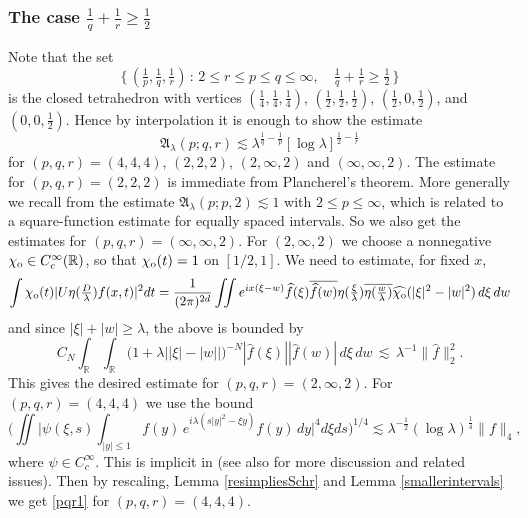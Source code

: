 \documentclass[11pt]{amsart}
\theoremstyle{definition}
\numberwithin{theorem}{section}
\numberwithin{definition}{section}
\numberwithin{equation}{section}
\newcommand{\Be}{\begin{equation}}
\newcommand{\Ee}{\end{equation}}
\newcommand{\R}{\mathbb{R}}
\renewcommand{\le}{\leqslant}
\renewcommand{\ge}{\geqslant}
\def\R{\mathbb R}
\def\lc{\lesssim}
\def\la{\lambda}             \def\La{\Lambda}
\def\fA{{\mathfrak {A}}}
\def\bbR{{\mathbb {R}}}
\renewcommand{\le}{\leqslant}
\renewcommand{\ge}{\geqslant}
\begin{document}
\subsubsection*{The case $\frac1q+\frac1r\ge \frac12$}
Note that the set
\[\big\{\,(\tfrac1p, \tfrac1q,\tfrac1r)\,:\,  2\le r\le p\le q\le \infty,\quad \tfrac1q+\tfrac1r\ge \tfrac12\,\big\}\]
is the closed tetrahedron with vertices $(\frac14, \frac14, \frac14)$, $(\frac12,\frac12,\frac12)$,
$(\frac12, 0,\frac12)$, and $(0, 0,\frac12)$.  Hence by interpolation  it is enough to show the estimate
\Be\label{pqr1}
\fA_\la(p;q ,r)\lc \la^{\frac1q-\frac1p} [\log \la]^{\frac12-\frac1r}
\Ee
for $ (p, q,r) =(4, 4, 4)$, $(2,2,2)$,
$(2, \infty , 2)$ and $(\infty, \infty, 2)$.   The estimate for $(p,q,r)=(2,2 ,2)$ is immediate from Plancherel's theorem.  More generally we recall from  \cite{lerose} the estimate $\fA_\la(p;p,2)\lc 1$ with
$2\le p\le \infty$,
 which is related to a square-function estimate for
 equally spaced intervals. So we also get the estimates for  $(p,q,r)=(\infty,\infty ,2)$.
For $(2,\infty ,2)$ we choose a nonnegative $\chi_{\rm{o}}\in C_c^\infty(\bbR)$, so that $\chi_{\rm{o}}(t)=1$ on $[1/2,1]$.
We need to estimate, for fixed $x$,
 \begin{equation*}\int \chi_{\rm{o}}(t) |U\eta(\tfrac D\la ) f(x,t)|^2 dt =
\frac{1}{(2\pi)^{2d}}\iint e^{ix(\xi-w)} \widehat
f(\xi)\overline{\widehat f(w) }
\eta(\tfrac{\xi}{\la})\overline{\eta(\tfrac{w}{\la}) }
\widehat{\chi_{\rm{o}}}(|\xi|^2-|w|^2)\, d\xi\,dw
\end{equation*} and since $|\xi|+|w|\ge \lambda$,  the above is bounded by
$$C_N \int_{\R}\int_{\R}  \big(1+\la\big||\xi|-|w |\big|\big)^{-N} |\widehat f(\xi)||\widehat f(w) | \,d\xi\,dw \,\lc\, \la^{-1}\|\widehat f\|_2^2.$$
This gives the desired estimate for $(p,q,r)=(2,\infty ,2)$. For   $(p,q,r)=(4,4,4)$ we use the bound
\[\Big(\iint \Big|\psi(\xi, s )\int_{|y|\le 1} f(y)\, e^{i \lambda( s  |y|^2-\xi y)} f(y)
   \,dy\Big|^4d\xi d s \Big)^{1/4}\lc   \lambda^{-\frac12}(\log\lambda)^\frac14 \|f\|_4,\]
   where $\psi\in C_c^\infty$. This is implicit in \cite{hoer2}
(see also \cite{ms} for more discussion and related issues).
Then by rescaling,  Lemma \ref{resimpliesSchr} and Lemma \ref{smallerintervals}
we get  \eqref{pqr1} for $(p,q,r)=(4,4,4)$.
\end{document}
